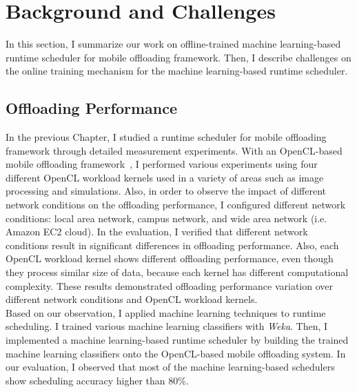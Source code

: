 \section{Background and Challenges}
\label{online:challenges}
%
In this section, I summarize our work on offline-trained
machine learning-based runtime scheduler for mobile offloading
framework.
%
Then, I describe challenges on the online training mechanism for the
machine learning-based runtime scheduler.
%

\subsection{Offloading Performance}
\label{online:performance}
In the previous Chapter, I studied a runtime scheduler for
mobile offloading framework through detailed measurement experiments.
%
With an OpenCL-based mobile offloading framework~\cite{ocloff}, I
performed various experiments using four different OpenCL workload
kernels used in a variety of areas such as image processing and
simulations.
%
Also, in order to observe the impact of different network conditions on
the offloading performance, I configured different network conditions:
local area network, campus network, and wide area network (i.e. Amazon
EC2 cloud).
%
In the evaluation, I verified that different network conditions result
in significant differences in offloading performance.
%
Also, each OpenCL workload kernel shows different offloading
performance, even though they process similar size of data, because each
kernel has different computational complexity.
%
These results demonstrated offloading performance
variation over different network conditions and OpenCL workload
kernels.\\
%
Based on our observation, I applied machine learning techniques
to runtime scheduling.
%
I trained various machine learning classifiers with
\textit{Weka}.
%
Then, I implemented a machine learning-based runtime scheduler by
building the trained machine learning classifiers onto the
OpenCL-based mobile offloading system.
%
In our evaluation, I observed that most of the machine learning-based
schedulers show scheduling accuracy higher than 80\%.
%

